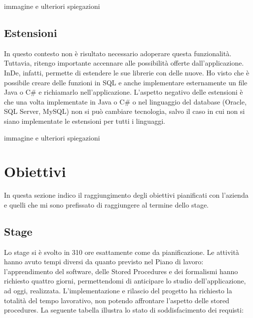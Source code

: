 \todo immagine e ulteriori spiegazioni

\subsection{Estensioni}
In questo contesto non è risultato necessario adoperare questa funzionalità. Tuttavia, ritengo importante accennare alle possibilità offerte dall'applicazione. InDe, infatti, permette di estendere le sue librerie con delle nuove. Ho visto che è possibile creare delle funzioni in SQL e anche implementare esternamente un file Java o C\# e richiamarlo nell'applicazione. 
L'aspetto negativo delle estensioni è che una volta implementate in Java o C\# o nel linguaggio del database (Oracle, SQL Server, MySQL) non si può cambiare tecnologia, salvo il caso in cui non si siano implementate le estensioni per tutti i linguaggi.

\todo immagine e ulteriori spiegazioni

\section{Obiettivi}
In questa sezione indico il raggiungimento degli obiettivi pianificati con l'azienda e quelli che mi sono prefissato di raggiungere al termine dello stage.

\subsection{Stage}
Lo stage si è svolto in 310 ore esattamente come da pianificazione. Le attività hanno avuto tempi diversi da quanto previsto nel Piano di lavoro: l'apprendimento del software, delle Stored Procedures e dei formalismi hanno richiesto quattro giorni, permettendomi di anticipare lo studio dell'applicazione, ad oggi, realizzata.  L'implementazione e rilascio del progetto ha richiesto la totalità del tempo lavorativo, non potendo affrontare l'aspetto delle stored procedures. 
La seguente tabella illustra lo stato di soddisfacimento dei requisti:

